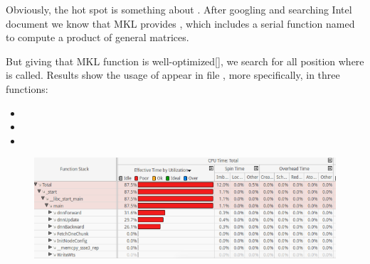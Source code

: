 \documentclass{article}
\begin{document}
Obviously, the hot spot is something about . After googling
and searching Intel document we know that MKL provides , which includes a serial function named  to compute a product of general matrices.%

But giving that MKL function is well-optimized[], we search for all position where  is called. Results show the usage of  appear in file , more specifically, in three functions:%

\begin{itemize}[noitemsep,topsep=\mdcompacttopsep]%

\item{}%

\item{}%

\item{}%
\end{itemize}%

\begin{figure}[tbp]%
\begin{mdcenter}%

\noindent{}\includegraphics[keepaspectratio=true,width=\dimmin{}{\dimwidth{0.90}}]{images/2016-02-19-10-36-25-}{}%

\mdhr{}%

\noindent{}%
\end{mdcenter}\label{fig-myfigure}%
\end{figure}%
\end{document}
